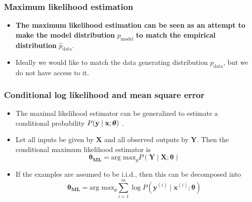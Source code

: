 \documentclass[notes]{beamer}          %
\newcommand{\vect}[1]{\bm{#1}}
\newif\iffull
\begin{document}
\begin{frame}
\frametitle{Maximum likelihood estimation}
    \begin{itemize}
        \item {\bf The maximum likelihood estimation can be seen as an attempt to make the model distribution } $p_{\mbox{model}}$ {\bf to match the empirical distribution} $\hat{p}_{\mbox{data}}$.
        \item Ideally we would like to match the data generating distribution $p_{\mbox{data}}$, but we do not have access to it.
    \end{itemize}
\end{frame}


\begin{frame}
\frametitle{Conditional log likelihood and mean square error}
    \begin{itemize}
        \item The maximal likelihood estimator can be generalized to estimate a conditional probability $P(\text{\bf y} \mid \text{\bf x} ; \vect{\theta})$ .
        \item Let all inputs be given by $\vect{X}$ and all observed outputs by $\vect{Y}$. Then the conditional maximum likelihood estimator is
        $$
        \vect{\theta_{\mbox{ML}}} = \mbox{arg max}_{\theta} P(\vect{Y} \mid \vect{X}; \vect{\theta})
        $$
        \item If the examples are assumed to be i.i.d., then this can be decomposed into
        $$
        \vect{\theta_{\mbox{ML}}} = \mbox{arg max}_{\theta} \sum_{i=1}^{m} \log P(\vect{y}^{(i)} \mid \vect{x}^{(i)}; \vect{\theta})
        $$
    \end{itemize}
\end{frame}

\iffull
\begin{frame}
\frametitle{Example: linear regression as maximum likelihood}
    \begin{itemize}
        \item The linear regression seen as an algorithm that learns to take an input $\vect{x}$ and produce output $\hat{y}$.
        \item This function from $\vect{x}$ to $\hat{y}$ is chosen to minimize the mean squared error.
        \item This criterion was introduced more or less arbitrarily.
        \item We revisit linear regression from the point of view of maximal likelihood.
        \item We think of the model as producing a conditional distribution $p(y \mid \vect{x})$ instead of a single prediction $\hat{y}$.
    \end{itemize}
\end{frame}
\fi
\end{document}
